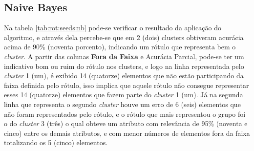 

\subsection{Naive Bayes} \label{cap:resultados:ssec:seed:nb}



Na tabela \ref{tab:rot:seeds:nb} pode-se verificar o resultado da aplicação do algoritmo, e através dela percebe-se que em 2 (dois) clusters obtiveram acurácia acima de 90\% (noventa porcento), indicando um rótulo que representa bem o \textit{cluster}. A partir das colunas  \textbf{Fora da Faixa} e Acurácia Parcial, pode-se ter um indicativo bom ou ruim do rótulo nos clusters, e  logo na linha representada pelo \textit{cluster} 1 (um), é exibido 14 (quatorze) elementos que não estão participando da faixa definida pelo rótulo, isso implica que aquele rótulo não consegue representar esses 14 (quatorze) elementos que fazem parte do \textit{cluster} 1 (um). Já na segunda linha que representa o segundo \textit{cluster} houve um erro de 6 (seis) elementos que não foram representados pelo rótulo, e o rótulo que mais representou o grupo foi o do \textit{cluster} 3 (três) o qual obteve um atributo com relevância de 95\% (noventa e cinco) entre os demais atributos, e com menor números de elementos fora da faixa totalizando os 5 (cinco) elementos. %


